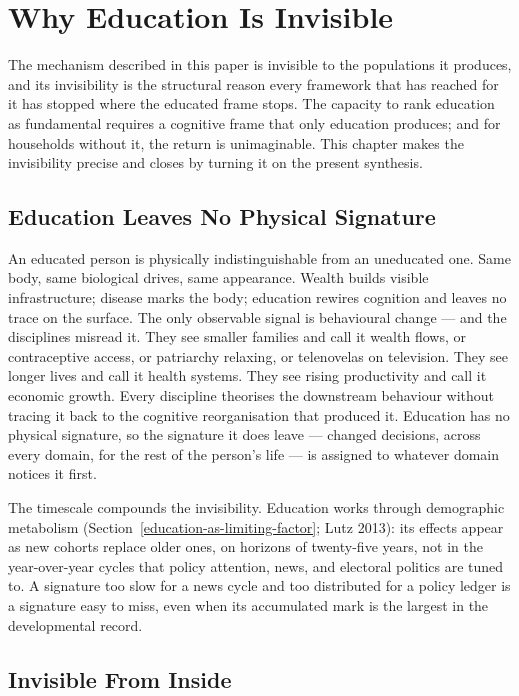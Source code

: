 \documentclass[12pt,letterpaper]{article}
\begin{document}
\section{Why Education Is Invisible}\label{why-education-is-invisible}

The mechanism described in this paper is invisible to the populations
it produces, and its invisibility is the structural reason every
framework that has reached for it has stopped where the educated
frame stops. The capacity to rank education as fundamental requires a
cognitive frame that only education produces; and for households
without it, the return is unimaginable. This chapter makes the
invisibility precise and closes by turning it on the present
synthesis.

\subsection{Education Leaves No Physical Signature}\label{education-leaves-no-physical-signature}

An educated person is physically indistinguishable from an uneducated
one. Same body, same biological drives, same appearance. Wealth builds
visible infrastructure; disease marks the body; education rewires
cognition and leaves no trace on the surface. The only observable signal
is behavioural change --- and the disciplines misread it. They see
smaller families and call it wealth flows, or contraceptive access, or
patriarchy relaxing, or telenovelas on television. They see longer
lives and call it health systems. They see rising productivity and
call it economic growth. Every discipline
theorises the downstream behaviour without tracing it back to the
cognitive reorganisation that produced it. Education has no physical
signature, so the signature it does leave --- changed decisions, across
every domain, for the rest of the person's life --- is assigned to
whatever domain notices it first.

The timescale compounds the invisibility. Education works through
demographic metabolism (Section~\ref{education-as-limiting-factor};
Lutz 2013): its effects appear as new cohorts replace older ones,
on horizons of twenty-five years, not in the year-over-year cycles
that policy attention, news, and electoral politics are tuned to.
A signature too slow for a news cycle and too distributed for a
policy ledger is a signature easy to miss, even when its
accumulated mark is the largest in the developmental record.

\subsection{Invisible From Inside}\label{invisible-from-inside}
\end{document}
